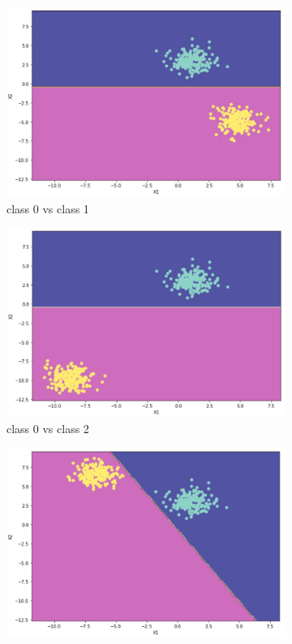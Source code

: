 \documentclass[11pt]{article}
\begin{document}
\newpage
\begin{figure}[h]
\centering
	\begin{subfigure}[b]{0.45\textwidth}
	\centering
	\includegraphics[scale=0.3]{dataset1a_perceptron_01_ds.jpg}
	\caption{class 0 vs class 1}
	\label{fig:fig1.1.7.1}
	\end{subfigure}
	\begin{subfigure}[b]{0.45\textwidth}
	\centering
	\includegraphics[scale=0.3]{dataset1a_perceptron_02_ds.jpg}
	\caption{class 0 vs class 2}
	\label{fig:fig1.1.7.2}
	\end{subfigure}
	\begin{subfigure}[b]{0.45\textwidth}
	\centering
	\includegraphics[scale=0.3]{dataset1a_perceptron_03_ds.jpg}

\end{subfigure}
\end{figure}
\end{document}
